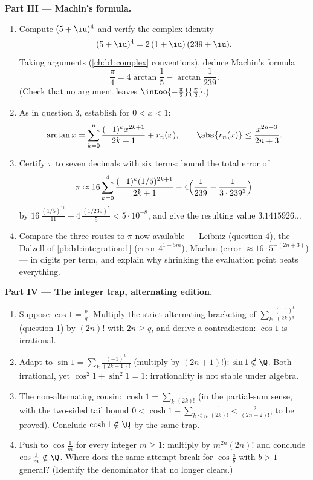 \begin{problem}
\medskip
\noindent\textbf{Part III --- Machin's formula.}
\begin{enumerate}[resume]
  \item Compute $(5 + \iu)^4$ and verify the complex identity
        \[
        (5 + \iu)^4 = 2\,(1 + \iu)\,(239 + \iu) .
        \]
        Taking arguments (\cref{ch:b1:complex} conventions),
        deduce Machin's formula
        \[
        \frac\pi4 = 4\arctan\frac15 - \arctan\frac{1}{239} .
        \]
        (Check that no argument leaves
        $\intoo{-\frac\pi2}{\frac\pi2}$.)
  \item As in question 3, establish for $0 < x < 1$:
        \[
        \arctan x = \sum_{k=0}^{n} \frac{(-1)^k
        x^{2k+1}}{2k+1} + r_n(x), \qquad \abs{r_n(x)} \leq
        \frac{x^{2n+3}}{2n+3} .
        \]
  \item Certify $\pi$ to seven decimals with six terms: bound
        the total error of
        \[
        \pi \approx 16\sum_{k=0}^{4}
        \frac{(-1)^k (1/5)^{2k+1}}{2k+1}
        - 4\Bigl(\frac{1}{239} - \frac{1}{3\cdot239^3}\Bigr)
        \]
        by $16\,\frac{(1/5)^{11}}{11} +
        4\,\frac{(1/239)^5}{5} < 5\cdot10^{-8}$, and give the
        resulting value $3.1415926\dots$
  \item Compare the three routes to $\pi$ now available ---
        Leibniz (question 4), the Dalzell  of
        \cref{pb:b1:integration:1} (error $4^{1-5m}$), Machin
        (error $\approx 16\cdot 5^{-(2n+3)}$) --- in digits per
        term, and explain why shrinking the evaluation point
        beats everything.
\end{enumerate}

\medskip
\noindent\textbf{Part IV --- The integer trap, alternating
edition.}
\begin{enumerate}[resume]
  \item Suppose $\cos 1 = \frac pq$. Multiply the strict
        alternating bracketing of $\sum_{k}
        \frac{(-1)^k}{(2k)!}$ (question 1) by $(2n)!$ with $2n
        \geq q$, and derive a contradiction: $\cos 1$ is
        irrational.
  \item Adapt to $\sin 1 = \sum_k \frac{(-1)^k}{(2k+1)!}$
        (multiply by $(2n+1)!$): $\sin 1 \notin \Q$. Both
        irrational, yet $\cos^2 1 + \sin^2 1 = 1$: irrationality
        is not stable under algebra.
  \item The non-alternating cousin: $\cosh 1 = \sum_k
        \frac{1}{(2k)!}$ (in the partial-sum sense, with the
        two-sided tail bound $0 < \cosh 1 - \sum_{k \leq n}
        \frac{1}{(2k)!} < \frac{2}{(2n+2)!}$, to be proved).
        Conclude $\cosh 1 \notin \Q$ by the same trap.
  \item Push to $\cos\frac 1m$ for every integer $m \geq 1$:
        multiply by $m^{2n}(2n)!$ and conclude $\cos\frac1m
        \notin \Q$. Where does the same attempt break for
        $\cos\frac ab$ with $b > 1$ general? (Identify the
        denominator that no longer clears.)
\end{enumerate}


\end{problem}
